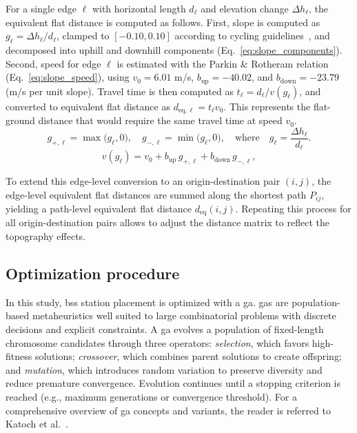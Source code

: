         For a single edge \(\ell\) with horizontal length \(d_{\ell}\) and elevation change \(\Delta h_{\ell}\), the equivalent flat distance is computed as follows. First, slope is computed as \(g_{\ell}=\Delta h_{\ell}/d_{\ell}\), clamped to $[-0.10,0.10]$ according to cycling guidelines~\cite{AASHTO1999bicycle, CycleHighways2025, CROW2006}, and decomposed into uphill and downhill components (Eq.~\ref{eq:slope_components}). Second, speed for edge \(\ell\) is estimated with the Parkin \& Rotheram relation (Eq.~\ref{eq:slope_speed}), using \(v_{0}=6.01\) m/s, \(b_{\mathrm{up}}=-40.02\), and \(b_{\mathrm{down}}=-23.79\) (m/s per unit slope). Travel time is then computed as \(t_{\ell}=d_{\ell}/v(g_{\ell})\), and converted to equivalent flat distance as \(d_{\mathrm{eq},\ell}=t_{\ell}v_{0}\). This represents the flat-ground distance that would require the same travel time at speed \(v_{0}\).
        \begin{equation}
            g_{+,\ell} = \max\!\bigl(g_{\ell},0\bigr), 
            \quad
            g_{-,\ell} = \min\!\bigl(g_{\ell},0\bigr),
            \quad\text{where}\quad
            g_{\ell} = \frac{\Delta h_{\ell}}{d_{\ell}}.
            \label{eq:slope_components}
            \end{equation}
            \begin{equation}
            v(g_{\ell})=v_{0}+b_{\mathrm{up}}\,g_{+,\ell}+b_{\mathrm{down}}\,g_{-,\ell},
            \label{eq:slope_speed}
            \end{equation}

        To extend this edge-level conversion to an origin-destination pair \((i,j)\), the edge-level equivalent flat distances are summed along the shortest path \(P_{ij}\), yielding a path-level equivalent flat distance $d_{\mathrm{eq}}(i,j)$. Repeating this process for all origin-destination pairs allows to adjust the distance matrix to reflect the topography effects. 
        

\subsection{Optimization procedure} \label{sec:GA}

    In this study, \ac{bss} station placement is optimized with a \ac{ga}. \acp{ga} are population-based metaheuristics well suited to large combinatorial problems with discrete decisions and explicit constraints. A \ac{ga} evolves a population of fixed-length chromosome candidates through three operators: \textit{selection}, which favors high-fitness solutions; \textit{crossover}, which combines parent solutions to create offspring; and \textit{mutation}, which introduces random variation to preserve diversity and reduce premature convergence. Evolution continues until a stopping criterion is reached (e.g., maximum generations or convergence threshold). For a comprehensive overview of \ac{ga} concepts and variants, the reader is referred to Katoch et al.~\cite{Katoch2021}.

